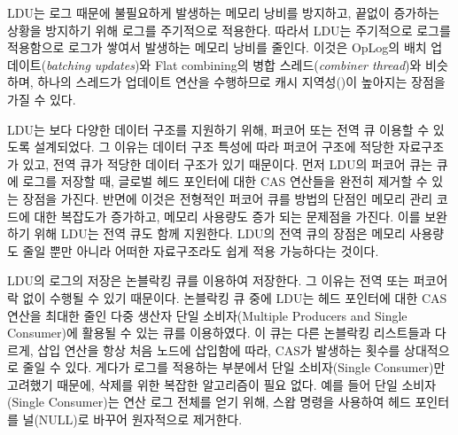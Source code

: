LDU는 로그 때문에 불필요하게 발생하는 메모리 낭비를 방지하고, 끝없이 증가하는 상황을 방지하기 위해 
로그를 주기적으로 적용한다. 
따라서 LDU는 주기적으로 로그를 적용함으로 로그가 쌓여서 발생하는 메모리 낭비를 줄인다. 
이것은 OpLog의 배치 업데이트(\textit{batching updates})와 Flat combining의 병합
스레드(\textit{combiner thread})와 비슷하며, 하나의 스레드가 업데이트 연산을 수행하므로 
캐시 지역성()이 높아지는 장점을 가질 수 있다.

LDU는 보다 다양한 데이터 구조를 지원하기 위해, 퍼코어 또는 전역 큐 이용할 수 있도록 
설계되었다.
그 이유는 데이터 구조 특성에 따라 퍼코어 구조에 적당한 자료구조가 있고,
전역 큐가 적당한 데이터 구조가 있기 때문이다.
먼저 LDU의 퍼코어 큐는 큐에 로그를 저장할 때, 글로벌 헤드 포인터에 대한 CAS
연산들을 완전히 제거할 수 있는 장점을 가진다.
반면에 이것은 전형적인 퍼코어 큐를 방법의 단점인 메모리 관리 코드에 대한 복잡도가 증가하고, 
메모리 사용량도 증가 되는 문제점을 가진다.
이를 보완하기 위해 LDU는 전역 큐도 함께 지원한다.
LDU의 전역 큐의 장점은 메모리 사용량도 줄일 뿐만 아니라 어떠한 자료구조라도 쉽게 적용 가능하다는 것이다. 

LDU의 로그의 저장은 논블락킹 큐를 이용하여 저장한다. 
그 이유는 전역 또는 퍼코어 락 없이 수행될 수 있기 때문이다. 
논블락킹 큐 중에 LDU는 헤드 포인터에 대한 CAS 연산을 최대한 줄인 다중 생산자 
단일 소비자(Multiple Producers and Single Consumer)에 활용될 수 있는 큐를 이용하였다.
이 큐는 다른 논블락킹 리스트들과 다르게, 삽입 연산을 항상 처음 노드에 삽입함에
따라, CAS가 발생하는 횟수를 상대적으로 줄일 수 있다.
게다가 로그를 적용하는 부분에서 단일 소비자(Single Consumer)만 고려했기 때문에, 
삭제를 위한 복잡한 알고리즘이 필요 없다. 
예를 들어 단일 소비자(Single Consumer)는 연산 로그 전체를 얻기 위해, 스왑 명령을 사용하여 
헤드 포인터를 널(NULL)로 바꾸어 원자적으로 제거한다.

